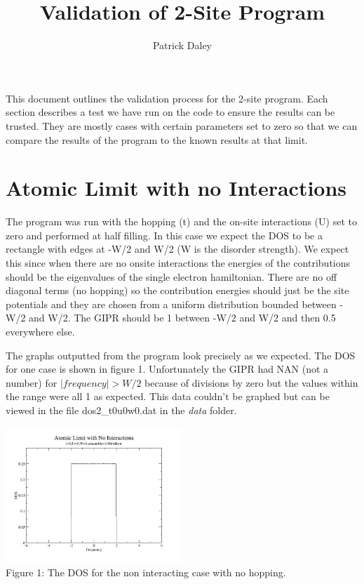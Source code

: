 \documentclass{article}
\author{Patrick Daley}
\title{Validation of 2-Site Program}
\begin{document}
\maketitle

This document outlines the validation process for the 2-site program. Each section describes a test we have run on the code to ensure the results can be trusted. They are mostly cases with certain parameters set to zero so that we can compare the results of the program to the known results at that limit. 

\section{Atomic Limit with no Interactions}
The program was run with the hopping (t) and the on-site interactions (U) set to zero and performed at half filling. In this case we expect the DOS to be a rectangle with edges at -W/2 and W/2 (W is the disorder strength). We expect this since when there are no onsite interactions the energies of the contributions should be the eigenvalues of the single electron hamiltonian. There are no off diagonal terms (no hopping) so the contribution energies should just be the site potentials and they are chosen from a uniform distribution bounded between -W/2 and W/2. The GIPR should be 1 between -W/2 and W/2 and then 0.5 everywhere else.

The graphs outputted from the program look precisely as we expected.  The DOS for one case is shown in figure 1. Unfortunately the GIPR had NAN (not a number) for $ | frequency | > W/2 $ because of divisions by zero but the values within the range were all 1 as expected. This data couldn't be graphed but can be viewed in the file dos2\_t0u0w0.dat in the \textit{data} folder.

\begin{center}
	\includegraphics[width=250px]{dos2_t0u0w4.jpg} \\
	Figure 1: The DOS for the non interacting case with no hopping.
\end{center}
\end{document}
